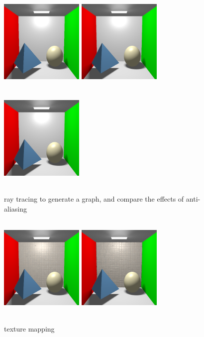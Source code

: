 \documentclass[acmtog]{acmart}
\begin{document}
\begin{figure}[h]
	\centering
	\includegraphics[width=4cm,height=5cm]{result_without_anti-aliasing}
	\includegraphics[width=4cm,height=5cm]{result_with_anti-aliasing}
	\includegraphics[width=4cm,height=5cm]{result_with_more_anti-aliasing}
	\caption{ray tracing to generate a graph, and compare the effects of anti-aliasing}
\end{figure}

\begin{figure}[h]
	\centering
	\includegraphics[width=4cm,height=5cm]{texture_mapping}
	\includegraphics[width=4cm,height=5cm]{texture_normal_displacement}
	\caption{texture mapping}
\end{figure}
\end{document}
